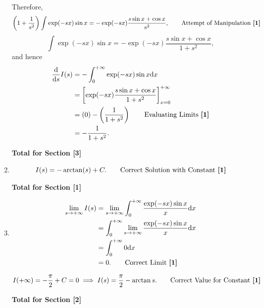 \documentclass[12pt]{article}
\begin{document}
\begin{enumerate}
                    Therefore,
                    \[
                        \left(1 + \frac{1}{s^2}\right) \int \exp(-sx) \sin x = - \exp(-sx) \frac{s\sin x + \cos x}{s^2}, \tag*{Attempt of Manipulation \textbf{[1]}}
                    \]
                    \[
                        \int \exp(-sx) \sin x = - \exp(-sx) \frac{s\sin x + \cos x}{1 + s^2},
                    \]
                    and hence
                    \begin{align*}
                        \frac{\mathrm{d}}{\mathrm{d}s} I(s) &= -\int_{0}^{+\infty} \exp(-sx) \sin x \mathrm{d}x\\
                        &= \left[\exp(-sx) \frac{s \sin x + \cos x}{1+s^2}\right]_{x = 0}^{+\infty}\\
                        &= \left(0\right) - \left(\frac{1}{1+s^2}\right) \tag*{Evaluating Limits \textbf{[1]}}\\
                        &= - \frac{1}{1+s^2}.
                    \end{align*}
                    
                    \hfill\textbf{Total for Section [3]}
                    
                \item 
                    \[I(s) = - \arctan(s) + C. \tag*{Correct Solution with Constant \textbf{[1]}}\]
                    
                    \hfill\textbf{Total for Section [1]}
            
                \item 
                    \begin{align*}
                        \lim_{s \to +\infty} I(s) &= \lim_{s \to +\infty} \int_{0}^{+\infty} \frac{\exp(-sx) \sin x}{x} \mathrm{d}x\\
                        &= \int_{0}^{+\infty} \lim_{s \to +\infty} \frac{\exp(-sx) \sin x}{x} \mathrm{d}x\\
                        &= \int_{0}^{+\infty} 0 \mathrm{d}x\\
                        &= 0. \tag*{Correct Limit \textbf{[1]}}
                    \end{align*}

                    \[I(+\infty) = - \frac{\pi}{2} + C = 0 \implies I(s) = \frac{\pi}{2} - \arctan s. \tag*{Correct Value for Constant \textbf{[1]}}\]
                    
                    \hfill\textbf{Total for Section [2]}
            

\end{enumerate}
\end{document}
